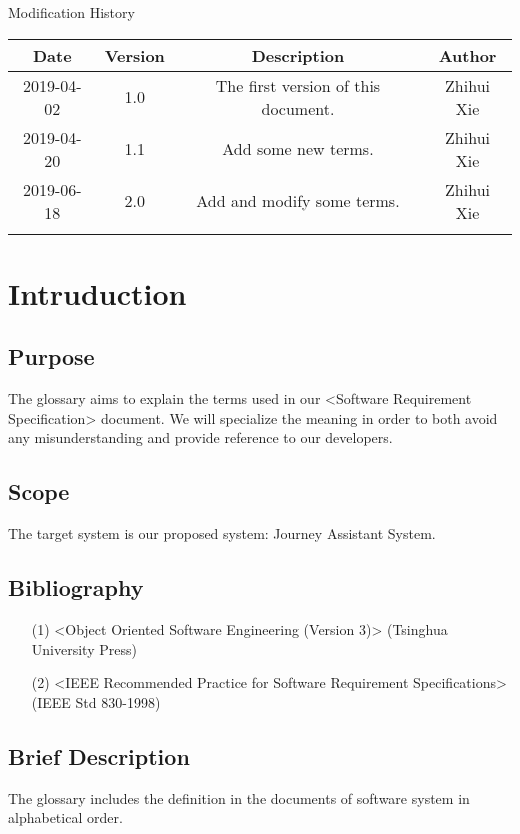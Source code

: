 \documentclass[10pt]{article}
\begin{document}
\newpage

\begin{center}
    {\LARGE Modification History}
    
    \begin{tabular}{|c|c|c|c|} 
        \hline 
        Date&Version&Description&Author\\
        \hline  
        2019-04-02&1.0&The first version of this document.&Zhihui Xie\\
		\hline 
		2019-04-20&1.1&Add some new terms.&Zhihui Xie\\
		\hline
		2019-06-18&2.0&Add and modify some terms.&Zhihui Xie\\
		\hline
		& & & \\
		\hline
    \end{tabular}    
\end{center}

\newpage

\tableofcontents
\newpage

\section{Intruduction}
\subsection{Purpose}
The glossary aims to explain the terms used in our <Software Requirement Specification> document. We will specialize the meaning in order to both avoid any misunderstanding and provide reference to our developers.

\subsection{Scope}
The target system is our proposed system: Journey Assistant System.

\subsection{Bibliography}
\begin{itemize}
    \item[(1)] <Object Oriented Software Engineering (Version 3)> (Tsinghua University Press)
    \item[(2)] <IEEE Recommended Practice for Software Requirement Specifications> (IEEE Std 830-1998)
\end{itemize}

\subsection{Brief Description}
The glossary includes the definition in the documents of software system in alphabetical order.
\end{document}
